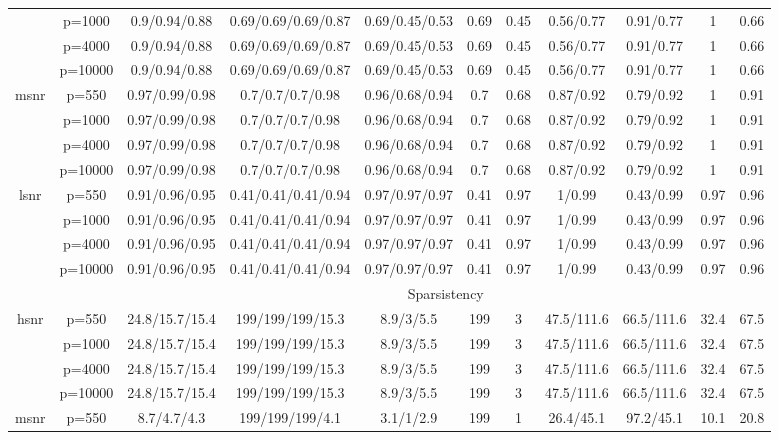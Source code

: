 \begin{table}[ht]
{\begin{tabular}{|c|c|ccccccccc|}
   & p=1000 & 0.9/0.94/0.88 & 0.69/0.69/0.69/0.87 & 0.69/0.45/0.53 & 0.69 & 0.45 & 0.56/0.77 & 0.91/0.77 & 1 & 0.66 \\ 
   & p=4000 & 0.9/0.94/0.88 & 0.69/0.69/0.69/0.87 & 0.69/0.45/0.53 & 0.69 & 0.45 & 0.56/0.77 & 0.91/0.77 & 1 & 0.66 \\ 
   & p=10000 & 0.9/0.94/0.88 & 0.69/0.69/0.69/0.87 & 0.69/0.45/0.53 & 0.69 & 0.45 & 0.56/0.77 & 0.91/0.77 & 1 & 0.66 \\ 
  \midrule\multirow{4}[2]{*}{msnr} & p=550 & 0.97/0.99/0.98 & 0.7/0.7/0.7/0.98 & 0.96/0.68/0.94 & 0.7 & 0.68 & 0.87/0.92 & 0.79/0.92 & 1 & 0.91 \\ 
   & p=1000 & 0.97/0.99/0.98 & 0.7/0.7/0.7/0.98 & 0.96/0.68/0.94 & 0.7 & 0.68 & 0.87/0.92 & 0.79/0.92 & 1 & 0.91 \\ 
   & p=4000 & 0.97/0.99/0.98 & 0.7/0.7/0.7/0.98 & 0.96/0.68/0.94 & 0.7 & 0.68 & 0.87/0.92 & 0.79/0.92 & 1 & 0.91 \\ 
   & p=10000 & 0.97/0.99/0.98 & 0.7/0.7/0.7/0.98 & 0.96/0.68/0.94 & 0.7 & 0.68 & 0.87/0.92 & 0.79/0.92 & 1 & 0.91 \\ 
  \midrule\multirow{4}[2]{*}{lsnr} & p=550 & 0.91/0.96/0.95 & 0.41/0.41/0.41/0.94 & 0.97/0.97/0.97 & 0.41 & 0.97 & 1/0.99 & 0.43/0.99 & 0.97 & 0.96 \\ 
   & p=1000 & 0.91/0.96/0.95 & 0.41/0.41/0.41/0.94 & 0.97/0.97/0.97 & 0.41 & 0.97 & 1/0.99 & 0.43/0.99 & 0.97 & 0.96 \\ 
   & p=4000 & 0.91/0.96/0.95 & 0.41/0.41/0.41/0.94 & 0.97/0.97/0.97 & 0.41 & 0.97 & 1/0.99 & 0.43/0.99 & 0.97 & 0.96 \\ 
   & p=10000 & 0.91/0.96/0.95 & 0.41/0.41/0.41/0.94 & 0.97/0.97/0.97 & 0.41 & 0.97 & 1/0.99 & 0.43/0.99 & 0.97 & 0.96 \\ 
   \midrule 
 \multicolumn{1}{|c}{} &       & \multicolumn{9}{c|}{Sparsistency} \\
\midrule\multirow{4}[2]{*}{hsnr} & p=550 & 24.8/15.7/15.4 & 199/199/199/15.3 & 8.9/3/5.5 & 199 & 3 & 47.5/111.6 & 66.5/111.6 & 32.4 & 67.5 \\ 
   & p=1000 & 24.8/15.7/15.4 & 199/199/199/15.3 & 8.9/3/5.5 & 199 & 3 & 47.5/111.6 & 66.5/111.6 & 32.4 & 67.5 \\ 
   & p=4000 & 24.8/15.7/15.4 & 199/199/199/15.3 & 8.9/3/5.5 & 199 & 3 & 47.5/111.6 & 66.5/111.6 & 32.4 & 67.5 \\ 
   & p=10000 & 24.8/15.7/15.4 & 199/199/199/15.3 & 8.9/3/5.5 & 199 & 3 & 47.5/111.6 & 66.5/111.6 & 32.4 & 67.5 \\ 
  \midrule\multirow{4}[2]{*}{msnr} & p=550 & 8.7/4.7/4.3 & 199/199/199/4.1 & 3.1/1/2.9 & 199 & 1 & 26.4/45.1 & 97.2/45.1 & 10.1 & 20.8 \\ 

\end{tabular}}
\end{table}
